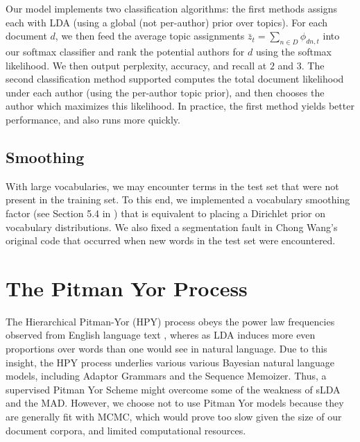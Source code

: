 \documentclass[14pt]{article} %
\theoremstyle{plain}
\theoremstyle{definition}
\theoremstyle{remark}
\begin{document}
\begin{appendix}
Our model implements two classification algorithms: the first methods assigns each with LDA (using a global (not per-author) prior over topics). For each document $d$, we then feed the average topic assignments $\bar{z}_{t}=\sum_{n\in D}\phi_{dn,t}$ into our softmax classifier and rank the potential authors for $d$ using the softmax likelihood. We then output perplexity, accuracy, and recall at $2$ and $3$. The second classification method supported computes the total document likelihood under each author (using the per-author topic prior), and then chooses the author which maximizes this likelihood. In practice, the first method yields better performance, and also runs more quickly.
 
\subsection{Smoothing}
\label{appendix:smoothing}
With large vocabularies, we may encounter terms in the test set that were not present in the training set. To this end, we implemented a vocabulary smoothing factor (see Section 5.4 in \cite{Blei2003}) that is equivalent to placing a Dirichlet prior on vocabulary distributions. We also fixed a segmentation fault in Chong Wang's original code that occurred when new words in the test set were encountered.

\section{The Pitman Yor Process}
The Hierarchical Pitman-Yor (HPY) process obeys the power law frequencies observed from English language text \cite{teh2006hierarchical}, wheres as LDA induces more even proportions over words than one would see in natural language. Due to this insight, the HPY process underlies various various Bayesian natural language models, including Adaptor Grammars \cite{johnson2007adaptor} and the Sequence Memoizer\cite{wood2009stochastic}. Thus, a supervised Pitman Yor Scheme might overcome some of the weakness of sLDA and the MAD. However, we choose not to use Pitman Yor models because they are generally fit with MCMC\cite{teh2006hierarchical}, which would prove too slow given the size of our document corpora, and limited computational resources.


\end{appendix}
\end{document}

